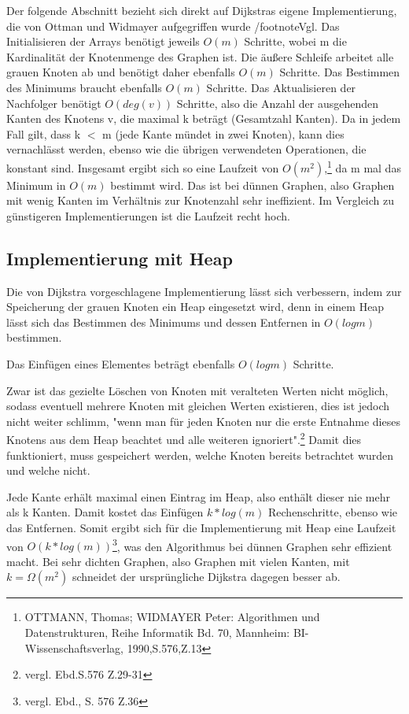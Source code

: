 Der folgende Abschnitt bezieht sich direkt auf Dijkstras eigene Implementierung, die von Ottman und Widmayer aufgegriffen wurde /footnote{Vgl. }
Das Initialisieren der Arrays benötigt jeweils $O(m)$ Schritte, wobei m die Kardinalität der Knotenmenge des Graphen ist.
Die äußere Schleife arbeitet alle grauen Knoten ab und benötigt daher ebenfalls $O(m)$ Schritte. Das Bestimmen des Minimums braucht ebenfalls $O(m)$ Schritte.
Das Aktualisieren der Nachfolger benötigt $O(deg(v))$ Schritte, also die Anzahl der ausgehenden Kanten des Knotens v, die maximal k beträgt (Gesamtzahl Kanten). Da in jedem Fall gilt, dass k $<$ m (jede Kante mündet in zwei Knoten), kann dies vernachlässt werden, ebenso wie die übrigen verwendeten Operationen, die konstant sind.
Insgesamt ergibt sich so eine Laufzeit von $O(m^{2})$,\footnote{OTTMANN, Thomas; WIDMAYER Peter: Algorithmen und Datenstrukturen, Reihe Informatik Bd. 70, Mannheim: BI-Wissenschaftsverlag, 1990,S.576,Z.13} da m mal das Minimum in $O(m)$ bestimmt wird.
Das ist bei dünnen Graphen, also Graphen mit wenig Kanten im Verhältnis zur Knotenzahl sehr ineffizient. Im Vergleich zu günstigeren Implementierungen ist die Laufzeit recht hoch.

\subsection{Implementierung mit Heap}
Die von Dijkstra vorgeschlagene Implementierung lässt sich verbessern, indem zur Speicherung der grauen Knoten ein Heap eingesetzt wird, denn in einem Heap lässt sich das Bestimmen des Minimums und dessen Entfernen in $O(log m)$ bestimmen.

\parindent0pt Das Einfügen eines Elementes beträgt ebenfalls $O(log m)$ Schritte.

\parindent0pt Zwar ist das gezielte Löschen von Knoten mit veralteten Werten nicht möglich, sodass eventuell mehrere Knoten mit gleichen Werten existieren, dies ist jedoch nicht weiter schlimm, "wenn man für jeden Knoten nur die erste Entnahme dieses Knotens aus dem Heap beachtet und alle weiteren ignoriert".\footnote{vergl. Ebd.S.576 Z.29-31} Damit dies funktioniert, muss  gespeichert werden, welche Knoten bereits betrachtet wurden und welche nicht.

\parindent0pt Jede Kante erhält maximal einen Eintrag im Heap, also enthält dieser nie mehr als k Kanten. Damit kostet das Einfügen $k*log(m)$ Rechenschritte, ebenso wie das Entfernen. Somit ergibt sich für die Implementierung mit Heap eine Laufzeit von $O(k*log(m))$\footnote{vergl. Ebd., S. 576 Z.36}, was den Algorithmus bei dünnen Graphen sehr effizient macht.
Bei sehr dichten Graphen, also Graphen mit vielen Kanten,  mit $k = \Omega (m^{2})$ schneidet der ursprüngliche Dijkstra dagegen besser ab.

